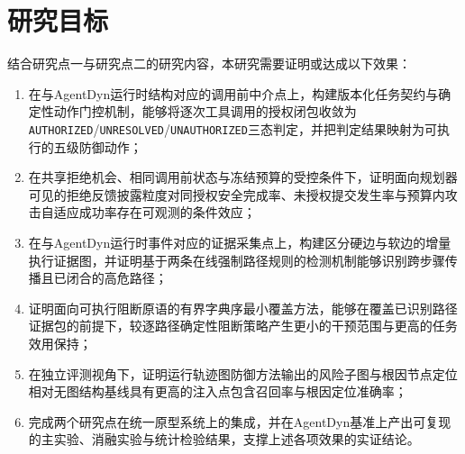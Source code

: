 \section{研究目标}

结合研究点一与研究点二的研究内容，本研究需要证明或达成以下效果：

\begin{enumerate}
  \item 在与AgentDyn运行时结构对应的调用前中介点上，构建版本化任务契约与确定性动作门控机制，能够将逐次工具调用的授权闭包收敛为\texttt{AUTHORIZED}/\texttt{UNRESOLVED}/\texttt{UNAUTHORIZED}三态判定，并把判定结果映射为可执行的五级防御动作；
  \item 在共享拒绝机会、相同调用前状态与冻结预算的受控条件下，证明面向规划器可见的拒绝反馈披露粒度对同授权安全完成率、未授权提交发生率与预算内攻击自适应成功率存在可观测的条件效应；
  \item 在与AgentDyn运行时事件对应的证据采集点上，构建区分硬边与软边的增量执行证据图，并证明基于两条在线强制路径规则的检测机制能够识别跨步骤传播且已闭合的高危路径；
  \item 证明面向可执行阻断原语的有界字典序最小覆盖方法，能够在覆盖已识别路径证据包的前提下，较逐路径确定性阻断策略产生更小的干预范围与更高的任务效用保持；
  \item 在独立评测视角下，证明运行轨迹图防御方法输出的风险子图与根因节点定位相对无图结构基线具有更高的注入点包含召回率与根因定位准确率；
  \item 完成两个研究点在统一原型系统上的集成，并在AgentDyn基准上产出可复现的主实验、消融实验与统计检验结果，支撑上述各项效果的实证结论。
\end{enumerate}
